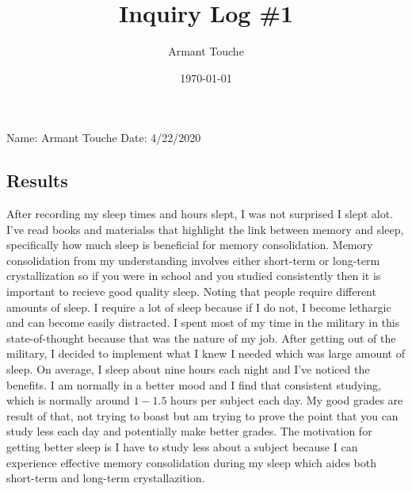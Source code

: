 \documentclass[a4paper,man,biblatex]{apa6}
\title{Inquiry Log \#1}
\author{Armant Touche}
\affiliation{Portland State University}
\date{\today}
\begin{document}
\thispagestyle{otherpage}
\setcounter{biburllcpenalty}{7000}
\setcounter{biburlucpenalty}{8000}


\noindent Name: Armant Touche\newline
\noindent Date: 4/22/2020

\subsection{Results}

After recording my sleep times and hours slept, I was not surprised I slept alot. I've read books and materialss that highlight the link between memory and sleep, specifically how much sleep is beneficial for memory consolidation. Memory consolidation from my understanding involves either short-term or long-term crystallization so if you were in school and you studied consistently then it is important to recieve good quality sleep. Noting that people require different amounts of sleep. I require a lot of sleep because if I do not, I become lethargic and can become easily distracted. I spent most of my time in the military in this state-of-thought because that was the nature of my job. After getting out of the military, I decided to implement what I knew I needed which was large amount of sleep. On average, I sleep about nine hours each night and I've noticed the benefits. I am normally in a better mood and I find that consistent studying, which is normally around $1-1.5$ hours per subject each day. My good grades are result of that, not trying to boast but am trying to prove the point that you can study less each day and potentially make better grades. The motivation for getting better sleep is I have to study less about a subject because I can experience effective memory consolidation during my sleep which aides both short-term and long-term crystallazition.
\end{document}
